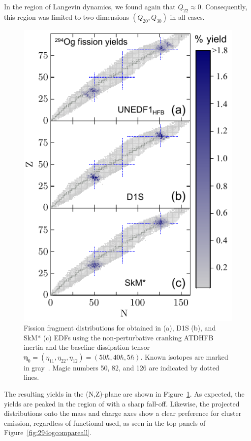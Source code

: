 In the region of Langevin dynamics, we found again that $Q_{22} \approx 0$. Consequently, this region was limited to two dimensions $(Q_{20}, Q_{30})$ in all cases.

\begin{figure}
	\centering
	\includegraphics[width=0.9\linewidth]{TeX_files/294Og_3yields}
	\caption[N-Z fission fragment yields from $^{294}$Og]{Fission fragment distributions for \Og{} obtained in \hfb{} (a), D1S (b), and SkM* (c) EDFs using the non-perturbative cranking ATDHFB inertia and  the baseline  dissipation tensor $\mathbf{\eta}_0 = (\eta_{11},\eta_{22},\eta_{12}) = (50\hbar,40\hbar,5\hbar)$. Known isotopes are marked in gray~\cite{NuDat}. Magic numbers 50, 82, and 126 are indicated by dotted lines.}
	\label{fig:294og3yields}
\end{figure}

The resulting yields in the (N,Z)-plane are shown in Figure~\ref{fig:294og3yields}. As expected, the yields are peaked in the region of {\Pb} with a sharp fall-off. Likewise, the projected distributions onto the mass and charge axes show a clear preference for cluster emission, regardless of functional used, as seen in the top panels of Figure~\ref{fig:294ogcompareall}.

